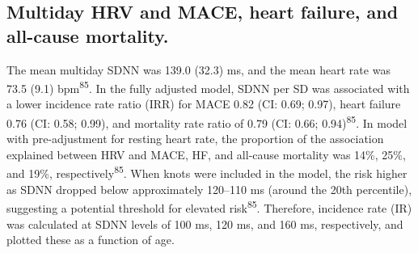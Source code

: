 \documentclass[
  letterpaper,
  headsepline=true,
  open=any]{scrbook}
\begin{document}
\restoregeometry

\hypertarget{multiday-hrv-and-mace-heart-failure-and-all-cause-mortality.}{%
\subsection{Multiday HRV and MACE, heart failure, and all-cause
mortality.}\label{multiday-hrv-and-mace-heart-failure-and-all-cause-mortality.}}

The mean multiday SDNN was 139.0 (32.3) ms, and the mean heart rate was
73.5 (9.1) bpm\textsuperscript{85}. In the fully adjusted model, SDNN
per SD was associated with a lower incidence rate ratio (IRR) for MACE
0.82 (CI: 0.69; 0.97), heart failure 0.76 (CI: 0.58; 0.99), and
mortality rate ratio of 0.79 (CI: 0.66; 0.94)\textsuperscript{85}. In
model with pre-adjustment for resting heart rate, the proportion of the
association explained between HRV and MACE, HF, and all-cause mortality
was 14\%, 25\%, and 19\%, respectively\textsuperscript{85}. When knots
were included in the model, the risk higher as SDNN dropped below
approximately 120--110 ms (around the 20th percentile), suggesting a
potential threshold for elevated risk\textsuperscript{85}. Therefore,
incidence rate (IR) was calculated at SDNN levels of 100 ms, 120 ms, and
160 ms, respectively, and plotted these as a function of age.

\end{document}

